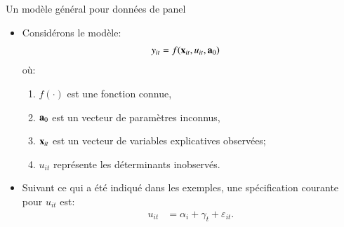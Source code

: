 \begin{frame}[allowframebreaks]{Un modèle général pour données de panel}
\begin{itemize}
    \item Considérons le modèle:
    \begin{align}
        y_{it}&= f(\bold{{\mathbf x}}_{it}, u_{it}, {\mathbf a}_0)
        \label{eq4}
    \end{align}
    où:
    \begin{enumerate}[$\star$]
    \item $f(\cdot)$ est une fonction connue,
    \item ${\mathbf a}_0$ est un vecteur de paramètres inconnus,
    \item $\bold{{\mathbf x}}_{it}$ est un vecteur de variables explicatives observées; 
    \item $u_{it}$ représente les déterminants inobservés.
    \end{enumerate}
     \item  Suivant ce qui a été indiqué dans les exemples, une spécification 
     courante pour $u_{it}$ est:
     \begin{align}
        u_{it} &=\alpha_i + \gamma_t + \varepsilon_{it}.
        \label{eq5}
     \end{align}
\end{itemize}
\end{frame}

